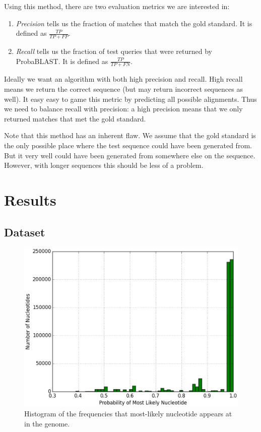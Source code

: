 \documentclass[11pt]{IEEEtran}
\begin{document}
Using this method, there are two evaluation metrics we are interested in:

\begin{enumerate}
\item \emph{Precision} tells us the fraction of matches that match the gold standard. It is defined as $\frac{TP}{TP+FP}$.
\item \emph{Recall} tells us the fraction of test queries that were returned by ProbaBLAST. It is defined as $\frac{TP}{TP+FN}$.
\end{enumerate}

Ideally we want an algorithm with both high precision and recall. High recall means we return the correct sequence (but may return incorrect sequences as well). It easy easy to game this metric by predicting all possible alignments. Thus we need to balance recall with precision: a high precision means that we only returned matches that met the gold standard.

Note that this method has an inherent flaw. We assume that the gold standard is the only possible place where the test sequence could have been generated from. But it very well could have been generated from somewhere else on the sequence. However, with longer sequences this should be less of a problem.

\section{Results}

\subsection{Dataset}

\begin{figure}
    \centering
    \includegraphics[scale=0.4]{data}
    \caption{Histogram of the frequencies that most-likely nucleotide appears at in the genome.}
    \label{data}
\end{figure}
\end{document}
